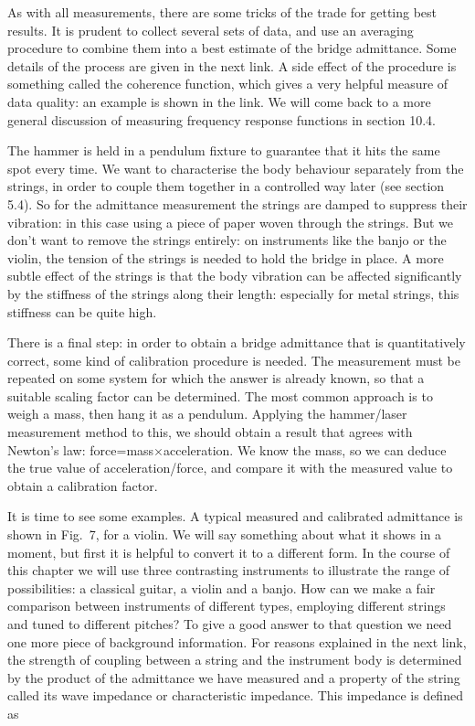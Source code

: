   As with all measurements, there are some tricks of the trade for getting best 
  results. It is prudent to collect several sets of data, and use an averaging 
  procedure to combine them into a best estimate of the bridge admittance. Some 
  details of the process are given in the next link. A side effect of the 
  procedure is something called the coherence function, which gives a very 
  helpful measure of data quality: an example is shown in the link. We will 
  come back to a more general discussion of measuring frequency response 
  functions in section 10.4. 

  The hammer is held in a pendulum fixture to guarantee that it hits the same 
  spot every time. We want to characterise the body behaviour separately from 
  the strings, in order to couple them together in a controlled way later (see 
  section 5.4). So for the admittance measurement the strings are damped to 
  suppress their vibration: in this case using a piece of paper woven through 
  the strings. But we don't want to remove the strings entirely: on instruments 
  like the banjo or the violin, the tension of the strings is needed to hold 
  the bridge in place. A more subtle effect of the strings is that the body 
  vibration can be affected significantly by the stiffness of the strings along 
  their length: especially for metal strings, this stiffness can be quite high. 

  There is a final step: in order to obtain a bridge admittance that is 
  quantitatively correct, some kind of calibration procedure is needed. The 
  measurement must be repeated on some system for which the answer is already 
  known, so that a suitable scaling factor can be determined. The most common 
  approach is to weigh a mass, then hang it as a pendulum. Applying the 
  hammer/laser measurement method to this, we should obtain a result that 
  agrees with Newton's law: force=mass$\times$acceleration. We know the mass, 
  so we can deduce the true value of acceleration/force, and compare it with 
  the measured value to obtain a calibration factor. 

  It is time to see some examples. A typical measured and calibrated admittance 
  is shown in Fig.\ 7, for a violin. We will say something about what it shows 
  in a moment, but first it is helpful to convert it to a different form. In 
  the course of this chapter we will use three contrasting instruments to 
  illustrate the range of possibilities: a classical guitar, a violin and a 
  banjo. How can we make a fair comparison between instruments of different 
  types, employing different strings and tuned to different pitches? To give a 
  good answer to that question we need one more piece of background 
  information. For reasons explained in the next link, the strength of coupling 
  between a string and the instrument body is determined by the product of the 
  admittance we have measured and a property of the string called its wave 
  impedance or characteristic impedance. This impedance is defined as 

